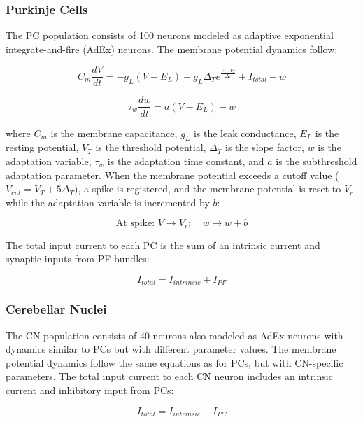 \subsubsection{Purkinje Cells}

The PC population consists of 100 neurons modeled as adaptive exponential integrate-and-fire (AdEx) neurons. The membrane potential dynamics follow:

\begin{equation}
C_m \frac{dV}{dt} = -g_L(V - E_L) + g_L \Delta_T e^{\frac{V-V_T}{\Delta_T}} + I_{total} - w
\end{equation}

\begin{equation}
\tau_w \frac{dw}{dt} = a(V - E_L) - w
\end{equation}

where $C_m$ is the membrane capacitance, $g_L$ is the leak conductance, $E_L$ is the resting potential, $V_T$ is the threshold potential, $\Delta_T$ is the slope factor, $w$ is the adaptation variable, $\tau_w$ is the adaptation time constant, and $a$ is the subthreshold adaptation parameter. When the membrane potential exceeds a cutoff value ($V_{cut} = V_T + 5\Delta_T$), a spike is registered, and the membrane potential is reset to $V_r$ while the adaptation variable is incremented by $b$:

\begin{equation}
\text{At spike: } V \rightarrow V_r; \quad w \rightarrow w + b
\end{equation}

The total input current to each PC is the sum of an intrinsic current and synaptic inputs from PF bundles:

\begin{equation}
I_{total} = I_{intrinsic} + I_{PF}
\end{equation}

\subsubsection{Cerebellar Nuclei}

The CN population consists of 40 neurons also modeled as AdEx neurons with dynamics similar to PCs but with different parameter values. The membrane potential dynamics follow the same equations as for PCs, but with CN-specific parameters. The total input current to each CN neuron includes an intrinsic current and inhibitory input from PCs:

\begin{equation}
I_{total} = I_{intrinsic} - I_{PC}
\end{equation}

